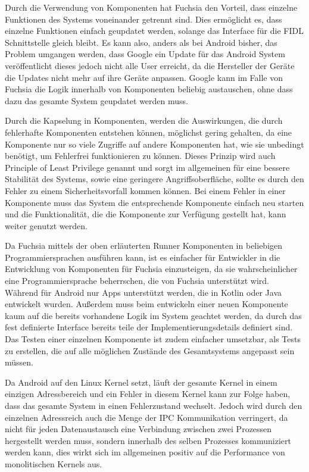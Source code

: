 \documentclass[a4paper]{scrartcl}
\begin{document}
Durch die Verwendung von Komponenten hat Fuchsia den Vorteil, dass einzelne Funktionen des Systems voneinander getrennt sind. Dies ermöglicht es, dass einzelne Funktionen einfach geupdatet werden, solange das Interface für die FIDL Schnittstelle gleich bleibt. Es kann also, anders als bei Android bisher, das Problem umgangen werden, dass Google ein Update für das Android System veröffentlicht dieses jedoch nicht alle User erreicht, da die Hersteller der Geräte die Updates nicht mehr auf ihre Geräte anpassen. Google kann im Falle von Fuchsia die Logik innerhalb von Komponenten beliebig austauschen, ohne dass dazu das gesamte System geupdatet werden muss.

Durch die Kapselung in Komponenten, werden die Auswirkungen, die durch fehlerhafte Komponenten entstehen können, möglichst gering gehalten, da eine Komponente nur so viele Zugriffe auf andere Komponenten hat, wie sie unbedingt benötigt, um Fehlerfrei funktionieren zu können. Dieses Prinzip wird auch Principle of Least Privilege genannt und sorgt im allgemeinen für eine bessere Stabilität des Systems, sowie eine geringere Angriffsoberfläche, sollte es durch den Fehler zu einem Sicherheitsvorfall kommen können.\cite{Android.Security.PoLP} Bei einem Fehler in einer Komponente muss das System die entsprechende Komponente einfach neu starten und die Funktionalität, die die Komponente zur Verfügung gestellt hat, kann weiter genutzt werden.

Da Fuchsia mittels der oben erläuterten Runner Komponenten in beliebigen Programmiersprachen ausführen kann, ist es einfacher für Entwickler in die Entwicklung von Komponenten für Fuchsia einzusteigen, da sie wahrscheinlicher eine Programmiersprache beherrschen, die von Fuchsia unterstützt wird. Während für Android nur Apps unterstützt werden, die in Kotlin oder Java entwickelt wurden. Außerdem muss beim entwickeln einer neuen Komponente kaum auf die bereits vorhandene Logik im System geachtet werden, da durch das fest definierte Interface bereits teile der Implementierungsdetails definiert sind. Das Testen einer einzelnen Komponente ist zudem einfacher umsetzbar, als Tests zu erstellen, die auf alle möglichen Zustände des Gesamtsystems angepasst sein müssen.

Da Android auf den Linux Kernel setzt, läuft der gesamte Kernel in einem einzigen Adressbereich und ein Fehler in diesem Kernel kann zur Folge haben, dass das gesamte System in einen Fehlerzustand wechselt. Jedoch wird durch den einzelnen Adressreich auch die Menge der IPC Kommunikation verringert, da nicht für jeden Datenaustausch eine Verbindung zwischen zwei Prozessen hergestellt werden muss, sondern innerhalb des selben Prozesses kommuniziert werden kann, dies wirkt sich im allgemeinen positiv auf die Performance von monolitischen Kernels aus.
\end{document}
